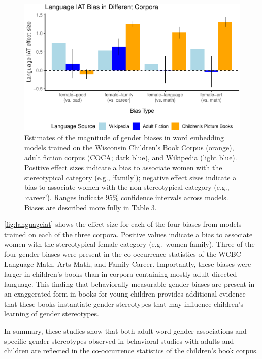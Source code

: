 \documentclass[
  english,
  ,man,floatsintext]{apa6}
\begin{document}
\begin{figure}[t!]
\includegraphics[width=\textwidth,]{kidbookgender_psych_sci_files/figure-latex/languageiat-1} \caption{Estimates of the magnitude of gender biases in word embedding models trained on the Wisconsin Children’s Book Corpus (orange), adult fiction corpus (COCA; dark blue), and Wikipedia (light blue). Positive effect sizes indicate a bias to associate women with the stereotypical category (e.g., ‘family'); negative effect sizes indicate a bias to associate women with the non-stereotypical category (e.g., ‘career’).  Ranges indicate 95\% confidence intervals across models. Biases are described more fully in Table 3.}\label{fig:languageiat}
\end{figure}

\autoref{fig:languageiat} shows the effect size for each of the four biases from models trained on each of the three corpora. Positive values indicate a bias to associate women with the stereotypical female category (e.g.~women-family). Three of the four gender biases were present in the co-occurrence statistics of the WCBC -- Language-Math, Arts-Math, and Family-Career. Importantly, these biases were larger in children's books than in corpora containing mostly adult-directed language. This finding that behaviorally measurable gender biases are present in an exaggerated form in books for young children provides additional evidence that these books instantiate gender stereotypes that may influence children's learning of gender stereotypes.

In summary, these studies show that both adult word gender associations and specific gender stereotypes observed in behavioral studies with adults and children are reflected in the co-occurrence statistics of the children's book corpus.
\end{document}
